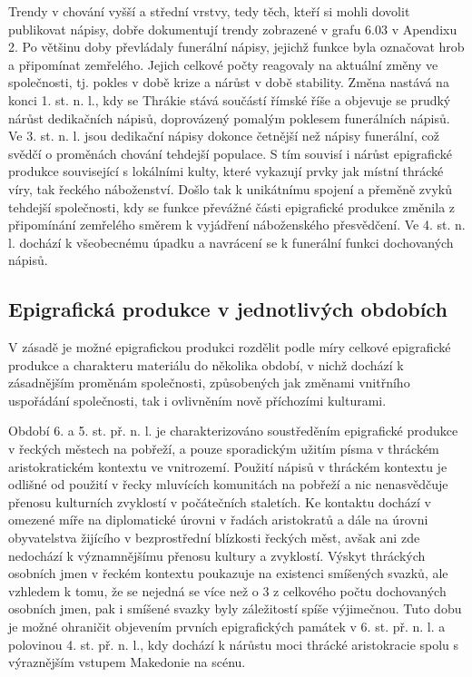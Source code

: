 Trendy v chování vyšší a střední vrstvy, tedy těch, kteří si mohli dovolit publikovat nápisy, dobře dokumentují trendy zobrazené v grafu 6.03 v Apendixu 2. Po většinu doby převládaly funerální nápisy, jejichž funkce byla označovat hrob a připomínat zemřelého. Jejich celkové počty reagovaly na aktuální změny ve společnosti, tj. pokles v době krize a nárůst v době stability. Změna nastává na konci 1. st. n. l., kdy se Thrákie stává součástí římské říše a objevuje se prudký nárůst dedikačních nápisů, doprovázený pomalým poklesem funerálních nápisů. Ve 3. st. n. l. jsou dedikační nápisy dokonce četnější než nápisy funerální, což svědčí o proměnách chování tehdejší populace. S tím souvisí i nárůst epigrafické produkce související s lokálními kulty, které vykazují prvky jak místní thrácké víry, tak řeckého náboženství. Došlo tak k unikátnímu spojení a přeměně zvyků tehdejší společnosti, kdy se funkce převážné části epigrafické produkce změnila z připomínání zemřelého směrem k vyjádření náboženského přesvědčení. Ve 4. st. n. l. dochází k všeobecnému úpadku a navrácení se k funerální funkci dochovaných nápisů.

\subsection[epigrafická-produkce-v-jednotlivých-obdobích]{Epigrafická produkce v jednotlivých obdobích}

V zásadě je možné epigrafickou produkci rozdělit podle míry celkové epigrafické produkce a charakteru materiálu do několika období, v nichž dochází k zásadnějším proměnám společnosti, způsobených jak změnami vnitřního uspořádání společnosti, tak i ovlivněním nově příchozími kulturami.

Období 6. a 5. st. př. n. l. je charakterizováno soustředěním epigrafické produkce v řeckých městech na pobřeží, a pouze sporadickým užitím písma v thráckém aristokratickém kontextu ve vnitrozemí. Použití nápisů v thráckém kontextu je odlišné od použití v řecky mluvících komunitách na pobřeží a nic nenasvědčuje přenosu kulturních zvyklostí v počátečních staletích. Ke kontaktu dochází v omezené míře na diplomatické úrovni v řadách aristokratů a dále na úrovni obyvatelstva žijícího v bezprostřední blízkosti řeckých měst, avšak ani zde nedochází k významnějšímu přenosu kultury a zvyklostí. Výskyt thráckých osobních jmen v řeckém kontextu poukazuje na existenci smíšených svazků, ale vzhledem k tomu, že se nejedná se více než o 3  z celkového počtu dochovaných osobních jmen, pak i smíšené svazky byly záležitostí spíše výjimečnou. Tuto dobu je možné ohraničit objevením prvních epigrafických památek v 6. st. př. n. l. a polovinou 4. st. př. n. l., kdy dochází k nárůstu moci thrácké aristokracie spolu s výraznějším vstupem Makedonie na scénu.

